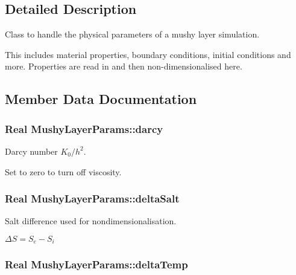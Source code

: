 \subsection{Detailed Description}
Class to handle the physical parameters of a mushy layer simulation. 

This includes material properties, boundary conditions, initial conditions and more. Properties are read in and then non-\/dimensionalised here. 

\subsection{Member Data Documentation}
\hypertarget{class_mushy_layer_params_a1cc8074618d57c994ce1771cba4a973c}{
\subsubsection[{darcy}]{\setlength{\rightskip}{0pt plus 5cm}Real Mushy\-Layer\-Params\-::darcy}}\label{class_mushy_layer_params_a1cc8074618d57c994ce1771cba4a973c}


Darcy number $ K_0/h^2 $. 

Set to zero to turn off viscosity. \hypertarget{class_mushy_layer_params_acea8da7cc75a779bb8dd7967fb3b0586}{
\subsubsection[{delta\-Salt}]{\setlength{\rightskip}{0pt plus 5cm}Real Mushy\-Layer\-Params\-::delta\-Salt}}\label{class_mushy_layer_params_acea8da7cc75a779bb8dd7967fb3b0586}


Salt difference used for nondimensionalisation. 

$ \Delta S = S_e - S_i $ \hypertarget{class_mushy_layer_params_ae221423b95517958c6a2c7acf5c271c6}{
\subsubsection[{delta\-Temp}]{\setlength{\rightskip}{0pt plus 5cm}Real Mushy\-Layer\-Params\-::delta\-Temp}}\label{class_mushy_layer_params_ae221423b95517958c6a2c7acf5c271c6}


